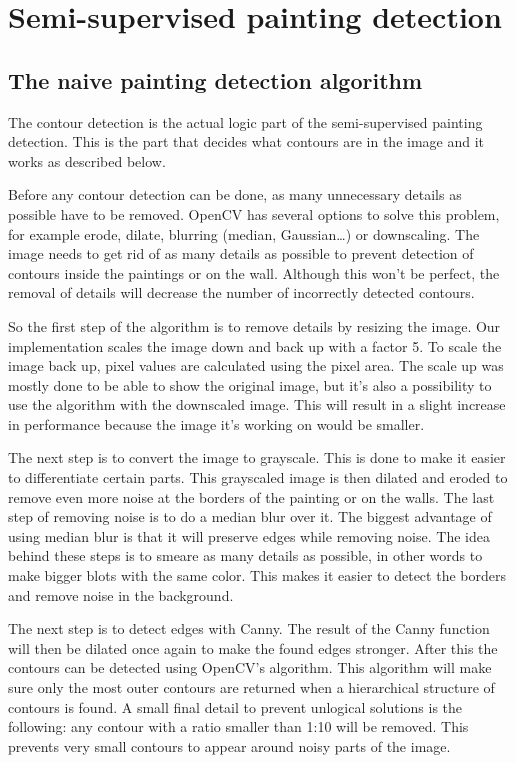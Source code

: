 \section{Semi-supervised painting detection}
\label{sec:assignment1}

\subsection{The naive painting detection algorithm}
\label{subsec:contour_detection}
The contour detection is the actual logic part of the semi-supervised painting detection. This is the part that decides what contours are in the image and it works as described below.

Before any contour detection can be done, as many unnecessary details as possible have to be removed. OpenCV has several options to solve this problem, for example erode, dilate, blurring (median, Gaussian\dots) or downscaling. The image needs to get rid of as many details as possible to prevent detection of contours inside the paintings or on the wall. Although this won't be perfect, the removal of details will decrease the number of incorrectly detected contours.

So the first step of the algorithm is to remove details by resizing the image. Our implementation scales the image down and back up with a factor 5. To scale the image back up, pixel values are calculated using the pixel area. The scale up was mostly done to be able to show the original image, but it's also a possibility to use the algorithm with the downscaled image. This will result in a slight increase in performance because the image it's working on would be smaller.

The next step is to convert the image to grayscale. This is done to make it easier to differentiate certain parts. This grayscaled image is then dilated and eroded to remove even more noise at the borders of the painting or on the walls. The last step of removing noise is to do a median blur over it. The biggest advantage of using median blur is that it will preserve edges while removing noise. The idea behind these steps is to smeare as many details as possible, in other words to make bigger blots with the same color. This makes it easier to detect the borders and remove noise in the background.

The next step is to detect edges with Canny. The result of the Canny function will then be dilated once again to make the found edges stronger. After this the contours can be detected using OpenCV's algorithm. This algorithm will make sure only the most outer contours are returned when a hierarchical structure of contours is found. A small final detail to prevent unlogical solutions is the following: any contour with a ratio smaller than 1:10 will be removed. This prevents very small contours to appear around noisy parts of the image.

